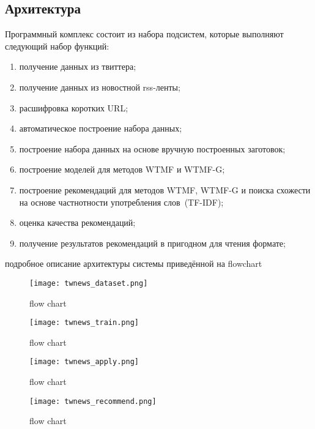 \subsection{Архитектура}
    Программный комплекс состоит из набора подсистем, которые выполняют следующий набор функций:
    \begin{enumerate}
        \item получение данных из твиттера;
        \item получение данных из новостной rss-ленты;
        \item расшифровка коротких URL;
        \item автоматическое построение набора данных;
        \item построение набора данных на основе вручную построенных заготовок;
        \item построение моделей для методов WTMF и WTMF-G;
        \item построение рекомендаций для методов WTMF, WTMF-G и поиска схожести на основе частнотности употребления слов~(TF-IDF);
        \item оценка качества рекомендаций;
        \item получение результатов рекомендаций в пригодном для чтения формате;
    \end{enumerate}

    подробное описание архитектуры системы приведённой на flowchart

    \begin{figure}[h!]
            \center
            \texttt{[image: twnews\_dataset.png]}
            \caption{flow chart}
            \label{pic:flowchart}
    \end{figure}



    \begin{figure}[h!]
            \center
            \texttt{[image: twnews\_train.png]}
            \caption{flow chart}
            \label{pic:flowchart}
    \end{figure}


    \begin{figure}[h!]
            \center
            \texttt{[image: twnews\_apply.png]}
            \caption{flow chart}
            \label{pic:flowchart}
    \end{figure}


    \begin{figure}[h!]
            \center
            \texttt{[image: twnews\_recommend.png]}
            \caption{flow chart}
            \label{pic:flowchart}
    \end{figure}

    \clearpage



